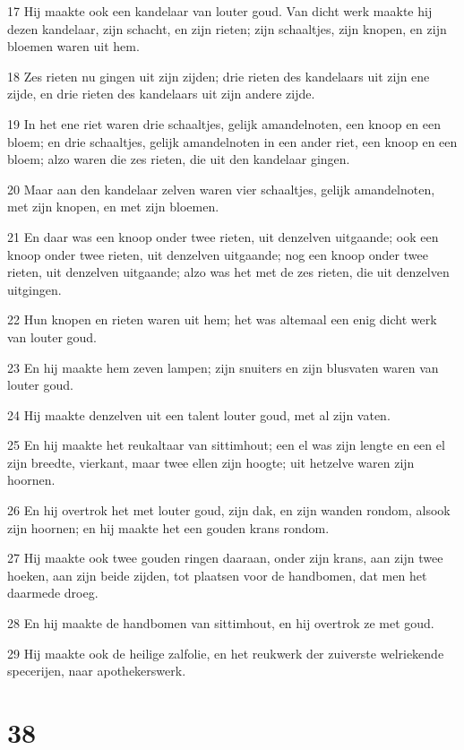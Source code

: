 \par 17 Hij maakte ook een kandelaar van louter goud. Van dicht werk maakte hij dezen kandelaar, zijn schacht, en zijn rieten; zijn schaaltjes, zijn knopen, en zijn bloemen waren uit hem.
\par 18 Zes rieten nu gingen uit zijn zijden; drie rieten des kandelaars uit zijn ene zijde, en drie rieten des kandelaars uit zijn andere zijde.
\par 19 In het ene riet waren drie schaaltjes, gelijk amandelnoten, een knoop en een bloem; en drie schaaltjes, gelijk amandelnoten in een ander riet, een knoop en een bloem; alzo waren die zes rieten, die uit den kandelaar gingen.
\par 20 Maar aan den kandelaar zelven waren vier schaaltjes, gelijk amandelnoten, met zijn knopen, en met zijn bloemen.
\par 21 En daar was een knoop onder twee rieten, uit denzelven uitgaande; ook een knoop onder twee rieten, uit denzelven uitgaande; nog een knoop onder twee rieten, uit denzelven uitgaande; alzo was het met de zes rieten, die uit denzelven uitgingen.
\par 22 Hun knopen en rieten waren uit hem; het was altemaal een enig dicht werk van louter goud.
\par 23 En hij maakte hem zeven lampen; zijn snuiters en zijn blusvaten waren van louter goud.
\par 24 Hij maakte denzelven uit een talent louter goud, met al zijn vaten.
\par 25 En hij maakte het reukaltaar van sittimhout; een el was zijn lengte en een el zijn breedte, vierkant, maar twee ellen zijn hoogte; uit hetzelve waren zijn hoornen.
\par 26 En hij overtrok het met louter goud, zijn dak, en zijn wanden rondom, alsook zijn hoornen; en hij maakte het een gouden krans rondom.
\par 27 Hij maakte ook twee gouden ringen daaraan, onder zijn krans, aan zijn twee hoeken, aan zijn beide zijden, tot plaatsen voor de handbomen, dat men het daarmede droeg.
\par 28 En hij maakte de handbomen van sittimhout, en hij overtrok ze met goud.
\par 29 Hij maakte ook de heilige zalfolie, en het reukwerk der zuiverste welriekende specerijen, naar apothekerswerk.

\chapter{38}

